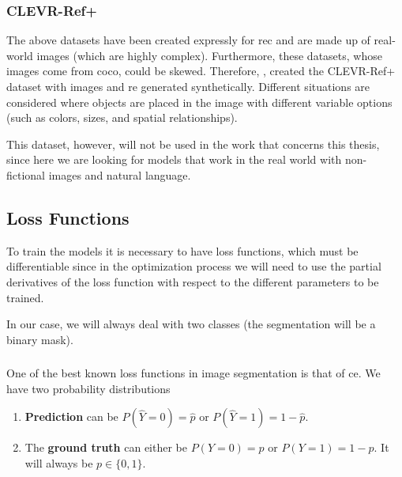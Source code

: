 \subsubsection{CLEVR-Ref+}

The above datasets have been created expressly for \gls{rec} and are made up of
real-world images (which are highly complex). Furthermore, these datasets,
whose images come from \gls{coco}, could be skewed. Therefore,
, created the CLEVR-Ref+ dataset with images and \gls{re}
generated synthetically. Different situations are considered where objects are
placed in the image with different variable options (such as colors, sizes, and
spatial relationships).

This dataset, however, will not be used in the work that concerns this thesis,
since here we are looking for models that work in the real world with
non-fictional images and natural language.


\subsection{Loss Functions}\label{sec:loss-functions}

To train the models it is necessary to have loss functions, which must be
differentiable since in the optimization process we will need to use the
partial derivatives of the loss function with respect to the different
parameters to be trained.

In our case, we will always deal with two classes (the segmentation will be a
binary mask).

\subsubsection{}

One of the best known loss functions in image segmentation is that of
\gls{ce}. We have two probability distributions

\begin{enumerate}
  \item \textbf{Prediction} can be \(P(\hat{Y} = 0) = \hat{p}\) or
  \(P(\hat{Y} = 1) = 1 - \hat{p}\).
  \item The \textbf{ground truth} can either be \(P(Y = 0) = p\) or
  \(P(Y = 1) = 1 - p\). It will always be \(p \in \{0, 1\}\).
\end{enumerate}


